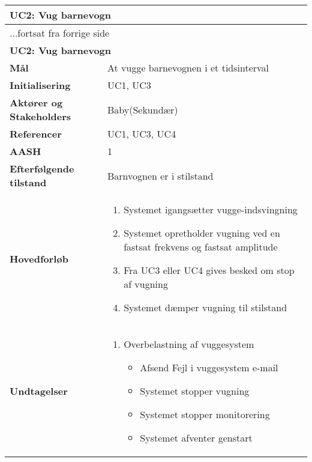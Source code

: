 \begin{center} \centering \label{kravspec:uc2}
	\begin{longtable}{|p{5cm}|p{9cm}|}  %
	\hline
		\multicolumn{2}{|l|}{\textbf{UC2: Vug barnevogn}} \\\hline %
		\endfirsthead
		
		\multicolumn{2}{l}{...fortsat fra forrige side} \\ \hline %
		\multicolumn{2}{|l|}{\textbf{UC2: Vug barnevogn}} \\\hline %
		\endhead	
		
		\textbf{Mål}							&At vugge barnevognen i et tidsinterval		\\\hline
		\textbf{Initialisering}				&UC1, UC3 \\\hline
		\textbf{Aktører og Stakeholders}		&Baby(Sekundær)		\\\hline 
		\textbf{Referencer}					&UC1, UC3, UC4		\\\hline
		\textbf{AASH}						&1		\\\hline
		\textbf{Efterfølgende tilstand}		&Barnvognen er i stilstand	\\\hline
		\textbf{Hovedforløb}					
			&\begin{enumerate}
	
				\item Systemet igangsætter vugge-indsvingning
				
				\item \label{kravspec:uc2_vugning}Systemet opretholder vugning ved en fastsat frekvens og fastsat amplitude
				\newline [Und: \ref{kravspec:uc2_vugning}.a Fejl i vuggesystem]	
				
				\item \label{kravspec:uc2_stopvugning}Fra UC3 eller UC4 	gives besked om stop af vugning	
				
				\item Systemet dæmper vugning til stilstand
				
			\end{enumerate}
		\\\hline
		\textbf{Undtagelser}
			&\begin{enumerate}[label=\ref{kravspec:uc2_vugning}.a]
			\item Overbelastning af vuggesystem
					\begin{itemize}
					
					\item Afsend Fejl i vuggesystem e-mail
					\item Systemet stopper vugning
					\item Systemet stopper monitorering
					\item Systemet afventer genstart
					\end{itemize}
			\end{enumerate}
		\\\hline
	\end{longtable} 
\end{center}

